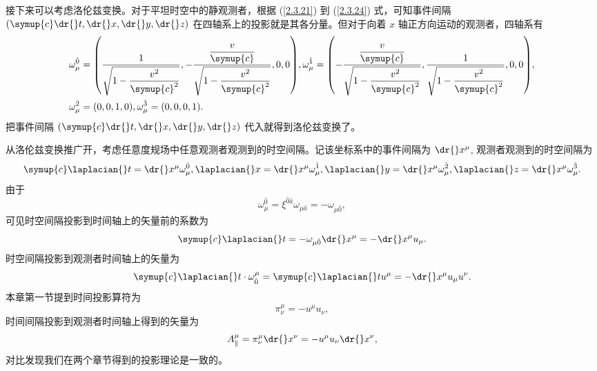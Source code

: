 \documentclass[UTF8, 12pt, a4paper, oneside, onecolumn, fontset=none]{ctexart}
\begin{document}
接下来可以考虑洛伦兹变换。对于平坦时空中的静观测者，根据 (\ref{2.3.21}) 到 (\ref{2.3.24}) 式，可知事件间隔 $\mleft(\symup{c}\dr{}t,\dr{}x,\dr{}y,\dr{}z\mright)$ 在四轴系上的投影就是其各分量。但对于向着 $x$ 轴正方向运动的观测者，四轴系有
\begin{align}
\omega^{\hat{0}}_{\mu}&=\mleft(\frac{1}{\sqrt{1-\dfrac{v^{2}}{\symup{c}^{2}}}},-\frac{\dfrac{v}{\symup{c}}}{\sqrt{1-\dfrac{v^{2}}{\symup{c}^{2}}}}, 0, 0\mright),\omega^{\hat{1}}_{\mu}=\mleft(-\frac{\dfrac{v}{\symup{c}}}{\sqrt{1-\dfrac{v^{2}}{\symup{c}^{2}}}},\frac{1}{\sqrt{1-\dfrac{v^{2}}{\symup{c}^{2}}}}, 0, 0\mright),\\
\omega^{\hat{2}}_{\mu}&=\mleft(0, 0, 1, 0\mright),\omega^{\hat{3}}_{\mu}=\mleft(0, 0, 0, 1\mright).
\end{align}
把事件间隔 $\mleft(\symup{c}\dr{}t,\dr{}x,\dr{}y,\dr{}z\mright)$ 代入就得到洛伦兹变换了。

从洛伦兹变换推广开，考虑任意度规场中任意观测者观测到的时空间隔。记该坐标系中的事件间隔为 $\dr{}x^{\mu}$, 观测者观测到的时空间隔为
\begin{equation}
\symup{c}\laplacian{}t=\dr{}x^{\mu}\omega_{\mu}^{\hat{0}},\laplacian{}x=\dr{}x^{\mu}\omega_{\mu}^{\hat{1}},\laplacian{}y=\dr{}x^{\mu}\omega_{\mu}^{\hat{2}},\laplacian{}z=\dr{}x^{\mu}\omega_{\mu}^{\hat{3}}.
\end{equation}
由于
\begin{equation}
\omega_{\mu}^{\hat{0}}=\xi^{\hat{0}\hat{a}}\omega_{\mu\hat{a}}=-\omega_{\mu\hat{0}},
\end{equation}
可见时空间隔投影到时间轴上的矢量前的系数为
\begin{equation}
\symup{c}\laplacian{}t=-\omega_{\mu\hat{0}}\dr{}x^{\mu}=-\dr{}x^{\mu}u_{\mu}.
\end{equation}
时空间隔投影到观测者时间轴上的矢量为
\begin{equation}
\symup{c}\laplacian{}t\cdot\omega^{\mu}_{\hat{0}}=\symup{c}\laplacian{}tu^{\mu}=-\dr{}x^{\mu}u_{\mu}u^{\nu}.
\end{equation}
本章第一节提到时间投影算符为
\begin{equation}
\pi^{\mu}_{\nu}=-u^{\mu}u_{\nu},
\end{equation}
时间间隔投影到观测者时间轴上得到的矢量为
\begin{equation}
A^{\mu}_{\parallel}=\pi^{\mu}_{\nu}\dr{}x^{\nu}=-u^{\mu}u_{\nu}\dr{}x^{\nu},
\end{equation}
对比发现我们在两个章节得到的投影理论是一致的。
\end{document}
